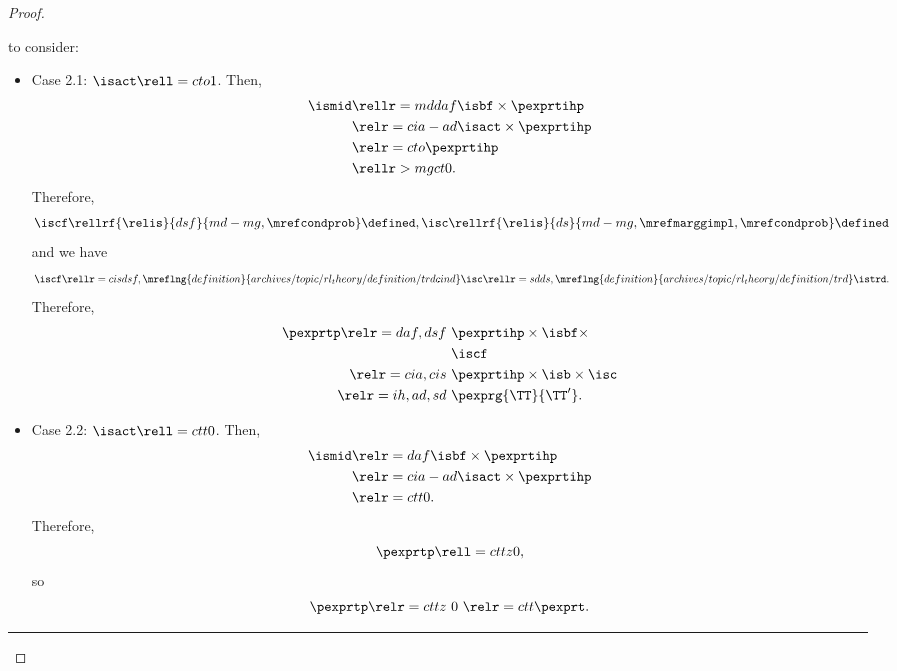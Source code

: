 \begin{proof}
\begin{itemize}
       to consider:
      \begin{itemize}
        \item Case 2.1: $\isact \rell = cto 1$.
          Then,
          \begin{align*}
            \ismid &\rellr = md daf \isbf \times \pexprtihp\\
                   &\relr = cia-ad \isact \times \pexprtihp\\
                   &\relr = cto \pexprtihp\\
                   &\rellr > mg ct 0.
          \end{align*}
          Therefore, 
          $$\iscf \rellrf{\relis}{dsf}{md-mg,\mrefcondprob} \defined,\isc \rellrf{\relis}{ds}{md-mg,\mrefmarggimpl,\mrefcondprob} \defined$$
          and we have
          $$\iscf 
          \rellr = cis dsf,\mreflng{definition}{archives/topic/rl_theory/definition/trdcind} \isc 
          \rellr = sd ds,\mreflng{definition}{archives/topic/rl_theory/definition/trd} \istrd.$$
          Therefore,
          \begin{align*}
            \pexprtp 
            \relr = daf,dsf \ & \pexprtihp \times \isbf \times\\& \iscf\\
            \relr = cia,cis \ & \pexprtihp \times \isb \times \isc\\
            \relr = ih,ad,sd \ & \pexprg{\TT}{\TT'}.
          \end{align*}
        \item Case 2.2: $\isact \rell = ctt 0$.
          Then,
          \begin{align*}
            \ismid &\relr = daf \isbf \times \pexprtihp\\
                   &\relr = cia-ad \isact \times \pexprtihp\\
                   &\relr = ctt 0.
          \end{align*}
          Therefore,
          $$\pexprtp \rell = cttz 0,$$
          so
          $$\pexprtp
          \relr = cttz \ 0 \ 
          \relr = ctt \pexprt.$$
      \end{itemize}
  \end{itemize}
  \hrule
\end{proof}
